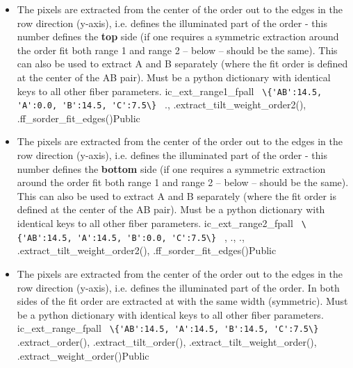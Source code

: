 \begin{itemize}
\item {}
{The pixels are extracted from the center of the order out to the edges in the row direction (y-axis), i.e. defines the illuminated part of the order - this number defines the \textbf{top} side (if one requires a symmetric extraction around the order fit both range 1 and range 2 -- below -- should be the same). This can also be used to extract A and B separately (where the fit order is defined at the center of the AB pair). Must be a python dictionary with identical keys to all other fiber parameters.}
{ic\_ext\_range1\_fpall}
{\lstinline[style=pythoninline]| \{'AB':14.5, 'A':0.0, 'B':14.5, 'C':7.5\} |}
{\calFFraw}{\constantsfile}
{\calextractRAW.\progMAIN, \spirouEXTOR.extract\_tilt\_weight\_order2(), \spirouPlot.ff\_sorder\_fit\_edges()}{Public}

\item {}
{The pixels are extracted from the center of the order out to the edges in the row direction (y-axis), i.e. defines the illuminated part of the order - this number defines the \textbf{bottom} side (if one requires a symmetric extraction around the order fit both range 1 and range 2 -- below -- should be the same). This can also be used to extract A and B separately (where the fit order is defined at the center of the AB pair). Must be a python dictionary with identical keys to all other fiber parameters.}
{ic\_ext\_range2\_fpall}
{\lstinline[style=pythoninline]| \{'AB':14.5, 'A':14.5, 'B':0.0, 'C':7.5\} |}
{\calFFraw, \calextractRAW}{\constantsfile}
{\calFFraw.\progMAIN, \calextractRAW.\progMAIN, \spirouEXTOR.extract\_tilt\_weight\_order2(), \spirouPlot.ff\_sorder\_fit\_edges()}{Public}

\item {}
{The pixels are extracted from the center of the order out to the edges in the row direction (y-axis), i.e. defines the illuminated part of the order. In \calextractRAW both sides of the fit order are extracted at with the same width (symmetric). Must be a python dictionary with identical keys to all other fiber parameters.}
{ic\_ext\_range\_fpall}
{\lstinline[style=pythoninline]| \{'AB':14.5, 'A':14.5, 'B':14.5, 'C':7.5\} |}
{\calextractRAW}{\constantsfile}
{\spirouEXTOR.extract\_order(), \spirouEXTOR.extract\_tilt\_order(), \spirouEXTOR.extract\_tilt\_weight\_order(), \spirouEXTOR.extract\_weight\_order()}{Public}


\end{itemize}

